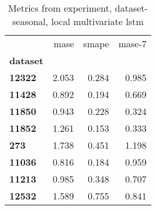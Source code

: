 \begin{table}[h]
\centering
\caption{Metrics from experiment, dataset-seasonal, local multivariate lstm}
\label{table:local-multivariate-lstm-dataset-seasonal}
\begin{tabular}{lrrr}
\toprule
{} &   mase &  smape &  mase-7 \\
\textbf{dataset} &        &        &         \\
\midrule
\textbf{12322  } &  2.053 &  0.284 &   0.985 \\
\textbf{11428  } &  0.892 &  0.194 &   0.669 \\
\textbf{11850  } &  0.943 &  0.228 &   0.324 \\
\textbf{11852  } &  1.261 &  0.153 &   0.333 \\
\textbf{273    } &  1.738 &  0.451 &   1.198 \\
\textbf{11036  } &  0.816 &  0.184 &   0.959 \\
\textbf{11213  } &  0.985 &  0.348 &   0.707 \\
\textbf{12532  } &  1.589 &  0.755 &   0.841 \\
\bottomrule
\end{tabular}
\end{table}
